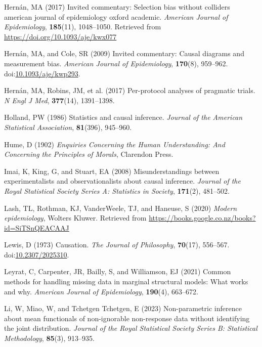 \documentclass[
  single column]{article}
\newlength{\cslhangindent}
\newenvironment{CSLReferences}[2] %
 {\begin{list}{}{%
  \setlength{\itemindent}{0pt}
  \setlength{\leftmargin}{0pt}
  \setlength{\parsep}{0pt}
  \ifodd #1
   \setlength{\leftmargin}{\cslhangindent}
   \setlength{\itemindent}{-1\cslhangindent}
  \fi
  \setlength{\itemsep}{#2\baselineskip}}}
 {\end{list}}
\begin{document}
\begin{CSLReferences}{1}{0}
Hernán, MA (2017) Invited commentary: Selection bias without colliders
\textbar{} american journal of epidemiology \textbar{} oxford academic.
\emph{American Journal of Epidemiology}, \textbf{185}(11), 1048--1050.
Retrieved from \url{https://doi.org/10.1093/aje/kwx077}

Hernán, MA, and Cole, SR (2009) Invited commentary: Causal diagrams and
measurement bias. \emph{American Journal of Epidemiology},
\textbf{170}(8), 959--962.
doi:\href{https://doi.org/10.1093/aje/kwp293}{10.1093/aje/kwp293}.

Hernán, MA, Robins, JM, et al. (2017) Per-protocol analyses of pragmatic
trials. \emph{N Engl J Med}, \textbf{377}(14), 1391--1398.

Holland, PW (1986) Statistics and causal inference. \emph{Journal of the
American Statistical Association}, \textbf{81}(396), 945--960.

Hume, D (1902) \emph{Enquiries Concerning the Human Understanding: And
Concerning the Principles of Morals}, Clarendon Press.

Imai, K, King, G, and Stuart, EA (2008) Misunderstandings between
experimentalists and observationalists about causal inference.
\emph{Journal of the Royal Statistical Society Series A: Statistics in
Society}, \textbf{171}(2), 481--502.

Lash, TL, Rothman, KJ, VanderWeele, TJ, and Haneuse, S (2020)
\emph{Modern epidemiology}, Wolters Kluwer. Retrieved from
\url{https://books.google.co.nz/books?id=SiTSnQEACAAJ}

Lewis, D (1973) Causation. \emph{The Journal of Philosophy},
\textbf{70}(17), 556--567.
doi:\href{https://doi.org/10.2307/2025310}{10.2307/2025310}.

Leyrat, C, Carpenter, JR, Bailly, S, and Williamson, EJ (2021) Common
methods for handling missing data in marginal structural models: What
works and why. \emph{American Journal of Epidemiology}, \textbf{190}(4),
663--672.

Li, W, Miao, W, and Tchetgen Tchetgen, E (2023) Non-parametric inference
about mean functionals of non-ignorable non-response data without
identifying the joint distribution. \emph{Journal of the Royal
Statistical Society Series B: Statistical Methodology}, \textbf{85}(3),
913--935.


\end{CSLReferences}
\end{document}
